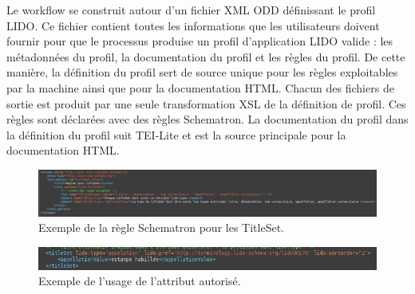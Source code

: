 Le workflow se construit autour d'un fichier XML ODD définissant le profil LIDO. Ce fichier contient toutes les informations que les utilisateurs doivent fournir pour que le processus produise un profil d'application LIDO valide : les métadonnées du profil, la documentation du profil et les règles du profil. De cette manière, la définition du profil sert de source unique pour les règles exploitables par la machine ainsi que pour la documentation HTML. Chacun des fichiers de sortie est produit par une seule transformation XSL de la définition de profil.
Ces règles sont  déclarées avec des règles Schematron. La documentation du profil dans la définition du profil suit TEI-Lite et est la source principale pour la documentation HTML. \newline

\begin{figure}[h!]
	\centerline{\includegraphics[width=\textwidth]{medias/exemple_schematron.png}}
	\caption{Exemple de la règle Schematron pour les TitleSet.}
\end{figure}

\begin{figure}[h!]
	\centerline{\includegraphics[width=\textwidth]{medias/exemple_attribut.png}}
	\caption{Exemple de l'usage de l'attribut autorisé.}
\end{figure}

